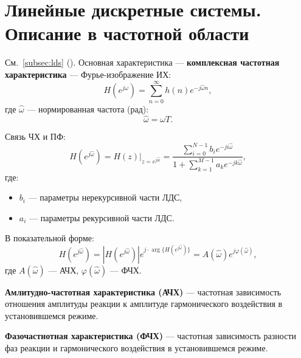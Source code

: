 \documentclass[a4paper, 14pt]{extarticle}
\begin{document}
\section{Линейные дискретные системы. Описание в частотной области}
См.~\ref{subsec:lds} ().
Основная характеристика --- \textbf{комплексная частотная характеристика} --- Фурье-изображение ИХ:
\begin{equation}
    H(e^{j \hat{ \omega }}) = \sum^{\infty}_{n=0} h(n) e^{-j \hat{ \omega } n},
\end{equation}
где $\hat{ \omega }$ --- нормированная частота (рад):
\begin{equation}
    \hat{ \omega } = \omega T.
\end{equation}

Связь ЧХ и ПФ:
\begin{equation}
    H(e^{j \hat{ \omega }}) = H(z) \big\vert_{z=e^{j \hat{w}}} = \dfrac{ \sum\limits^{N-1}_{i=0} b_i e^{-ji \hat{ \omega }} }{1 + \sum\limits^{M-1}_{k=1} a_k e^{-jk \hat{ \omega }}},
\end{equation}
где:
\begin{itemize}
    \item $b_i$ --- параметры нерекурсивной части ЛДС,
    \item $a_i$ --- параметры рекурсивной части ЛДС.
\end{itemize}

В показательной форме:
\begin{equation}
    H(e^{j \hat{ \omega }}) = \left| H(e^{j \hat{ \omega }}) \right| e^{j \cdot \arg \{ H(e^{j \hat{ \omega }}) \} } = A(\hat{ \omega }) e^{j \varphi(\hat{ \omega })},
\end{equation}
где $A(\hat{ \omega })$ --- АЧХ, $\varphi( \hat{ \omega } )$ --- ФЧХ.

\textbf{Амлитудно-частотная характеристика (АЧХ)} --- частотная зависимость отношения амплитуды реакции к амплитуде гармонического воздействия в установившемся режиме.

\textbf{Фазочастнотная характеристика (ФЧХ)} --- частотная зависимость разности фаз реакции и гармонического воздействия в установившемся режиме.
\end{document}

